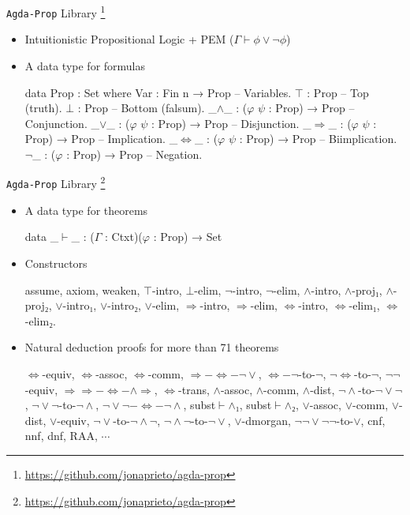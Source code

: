\documentclass[xetex, hyperref={pdfpagelabels=false}]{beamer}
\begin{document}
\begin{frame}[fragile, label=agda-prop-2]{\texttt{Agda-Prop} Library
  \footnote{\url{https://github.com/jonaprieto/agda-prop}}}
\begin{itemize}
  \item Intuitionistic Propositional Logic + PEM ($Γ ⊢ ϕ ∨ ¬ ϕ$)
  \item A data type for formulas
\begin{agda}
data Prop : Set where
  Var  : Fin n → Prop           -- Variables.
  $⊤$    : Prop                   -- Top (truth).
  $⊥$    : Prop                   -- Bottom (falsum).
  _$∧$_  : ($φ$ $ψ$ : Prop) → Prop    -- Conjunction.
  _$∨$_  : ($φ$ $ψ$ : Prop) → Prop    -- Disjunction.
  _$⇒$_  : ($φ$ $ψ$ : Prop) → Prop    -- Implication.
  _$⇔$_  : ($φ$ $ψ$ : Prop) → Prop    -- Biimplication.
  $¬$_   : ($φ$ : Prop) → Prop      -- Negation.
\end{agda}
\end{itemize}
\end{frame}

\begin{frame}[fragile, label=agda-prop]{\texttt{Agda-Prop} Library
  \footnote{\url{https://github.com/jonaprieto/agda-prop}}}
\begin{itemize}
  \item A data type for theorems
\begin{agda}
data _$⊢$_ : ($Γ$ : Ctxt)($φ$ : Prop) → Set
\end{agda}

\item Constructors
\begin{agda}
assume, axiom, weaken, $⊤$-intro, $⊥$-elim, $¬$-intro,
$¬$-elim, $∧$-intro, $∧$-proj$₁$, $∧$-proj$₂$, $∨$-intro$₁$,
$∨$-intro$₂$, $∨$-elim, $⇒$-intro, $⇒$-elim, $⇔$-intro,
$⇔$-elim$₁$, $⇔$-elim$₂$.
\end{agda}
  \item Natural deduction proofs for more than 71 theorems
\begin{agda}
$⇔$-equiv, $⇔$-assoc, $⇔$-comm, $⇒-⇔-¬∨$, $⇔-¬$-to-$¬$,
$¬⇔$-to-$¬$, $¬¬$-equiv, $⇒⇒-⇔-∧⇒$, $⇔$-trans, $∧$-assoc,
$∧$-comm, $∧$-dist, $¬∧$-to-$¬∨¬$, $¬∨¬$-to-$¬∧$, $¬∨¬-⇔-¬∧$,
subst$⊢∧₁$, subst$⊢∧₂$, $∨$-assoc, $∨$-comm, $∨$-dist,
$∨$-equiv, $¬∨$-to-$¬∧¬$, $¬∧¬$-to-$¬∨$, $∨$-dmorgan,
$¬¬∨¬¬$-to-$∨$, cnf, nnf, dnf, RAA, $\cdots$
\end{agda}
\end{itemize}
\end{frame}
\end{document}
